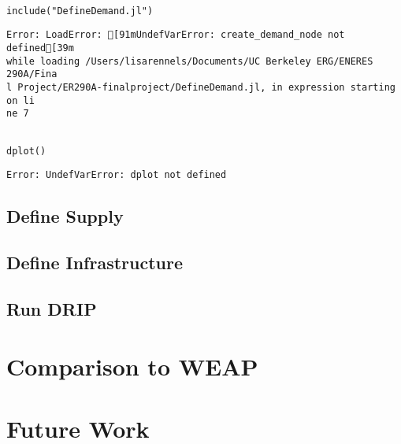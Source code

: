 \documentclass[12pt,a4paper]{article}
\begin{document}
\begin{verbatim}

include("DefineDemand.jl")

\end{verbatim}

\begin{verbatim}
Error: LoadError: [91mUndefVarError: create_demand_node not defined[39m
while loading /Users/lisarennels/Documents/UC Berkeley ERG/ENERES 290A/Fina
l Project/ER290A-finalproject/DefineDemand.jl, in expression starting on li
ne 7
\end{verbatim}


\begin{verbatim}

dplot()

\end{verbatim}

\begin{verbatim}
Error: UndefVarError: dplot not defined
\end{verbatim}


\subsection{Define Supply}
\subsection{Define Infrastructure}
\subsection{Run DRIP}
\section{Comparison to WEAP}
\section{Future Work}
\end{document}
